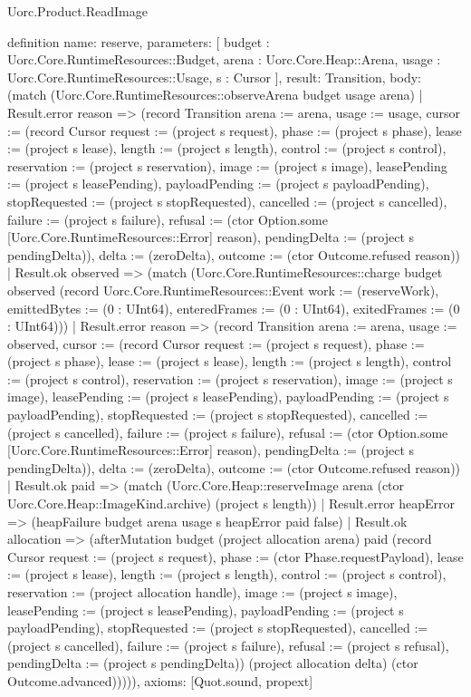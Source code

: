 \begin{lexlean}{Uorc.Product.ReadImage}
\begin{semanticmodule}
definition{
  name: reserve,
  parameters: [
    budget : Uorc.Core.RuntimeResources::Budget,
    arena : Uorc.Core.Heap::Arena,
    usage : Uorc.Core.RuntimeResources::Usage,
    s : Cursor
  ],
  result: Transition,
  body: (match (Uorc.Core.RuntimeResources::observeArena budget usage arena)
    | Result.error reason => (record Transition {arena := arena, usage := usage, cursor := (record Cursor {request := (project s request), phase := (project s phase), lease := (project s lease), length := (project s length), control := (project s control), reservation := (project s reservation), image := (project s image), leasePending := (project s leasePending), payloadPending := (project s payloadPending), stopRequested := (project s stopRequested), cancelled := (project s cancelled), failure := (project s failure), refusal := (ctor Option.some [Uorc.Core.RuntimeResources::Error] reason), pendingDelta := (project s pendingDelta)}), delta := (zeroDelta), outcome := (ctor Outcome.refused reason)})
    | Result.ok observed => (match (Uorc.Core.RuntimeResources::charge budget observed (record Uorc.Core.RuntimeResources::Event {work := (reserveWork), emittedBytes := (0 : UInt64), enteredFrames := (0 : UInt64), exitedFrames := (0 : UInt64)}))
      | Result.error reason => (record Transition {arena := arena, usage := observed, cursor := (record Cursor {request := (project s request), phase := (project s phase), lease := (project s lease), length := (project s length), control := (project s control), reservation := (project s reservation), image := (project s image), leasePending := (project s leasePending), payloadPending := (project s payloadPending), stopRequested := (project s stopRequested), cancelled := (project s cancelled), failure := (project s failure), refusal := (ctor Option.some [Uorc.Core.RuntimeResources::Error] reason), pendingDelta := (project s pendingDelta)}), delta := (zeroDelta), outcome := (ctor Outcome.refused reason)})
      | Result.ok paid => (match (Uorc.Core.Heap::reserveImage arena (ctor Uorc.Core.Heap::ImageKind.archive) (project s length))
        | Result.error heapError => (heapFailure budget arena usage s heapError paid false)
        | Result.ok allocation => (afterMutation budget (project allocation arena) paid (record Cursor {request := (project s request), phase := (ctor Phase.requestPayload), lease := (project s lease), length := (project s length), control := (project s control), reservation := (project allocation handle), image := (project s image), leasePending := (project s leasePending), payloadPending := (project s payloadPending), stopRequested := (project s stopRequested), cancelled := (project s cancelled), failure := (project s failure), refusal := (project s refusal), pendingDelta := (project s pendingDelta)}) (project allocation delta) (ctor Outcome.advanced))))),
  axioms: [Quot.sound, propext]
}


\end{semanticmodule}
\end{lexlean}
